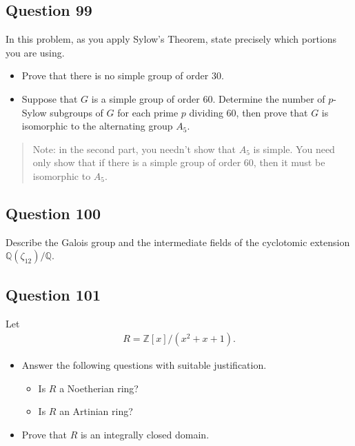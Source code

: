 \documentclass[12pt]{article}
\providecommand{\tightlist}{%
  \setlength{\itemsep}{0pt}\setlength{\parskip}{0pt}}
\begin{document}
\hypertarget{question-99}{%
\subsection{Question 99}\label{question-99}}

In this problem, as you apply Sylow's Theorem, state precisely which
portions you are using.

\begin{itemize}
\item
  Prove that there is no simple group of order 30.
\item
  Suppose that \(G\) is a simple group of order 60. Determine the number
  of \(p\)-Sylow subgroups of \(G\) for each prime \(p\) dividing 60,
  then prove that \(G\) is isomorphic to the alternating group \(A_5\).
\end{itemize}

\begin{quote}
Note: in the second part, you needn't show that \(A_5\) is simple. You
need only show that if there is a simple group of order 60, then it must
be isomorphic to \(A_5\).
\end{quote}

\hypertarget{question-100}{%
\subsection{Question 100}\label{question-100}}

Describe the Galois group and the intermediate fields of the cyclotomic
extension \(\mathbb Q(\zeta_{12})/\mathbb Q\).

\hypertarget{question-101}{%
\subsection{Question 101}\label{question-101}}

Let \begin{align*}
R=\mathbb Z[x]/(x^2+x+1).
\end{align*}

\begin{itemize}
\tightlist
\item
  Answer the following questions with suitable justification.

  \begin{itemize}
  \tightlist
  \item
    Is \(R\) a Noetherian ring?
  \item
    Is \(R\) an Artinian ring?
  \end{itemize}
\item
  Prove that \(R\) is an integrally closed domain.
\end{itemize}
\end{document}
